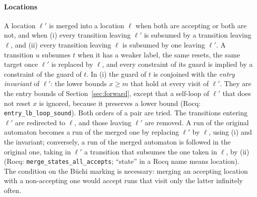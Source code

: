 \paragraph{Locations}
A location $\ell'$ is merged into a location $\ell$ when both are accepting or
both are not, and when (i) every transition leaving $\ell'$ is subsumed by a
transition leaving $\ell$, and (ii) every transition leaving $\ell$ is subsumed
by one leaving $\ell'$.  A transition $u$ subsumes $t$ when it has a weaker
label, the same resets, the same target once $\ell'$ is replaced by $\ell$, and
every constraint of its guard is implied by a constraint of the guard of $t$.
In (i) the guard of $t$ is conjoined with the \emph{entry invariant} of
$\ell'$: the lower bounds $x\ge m$ that hold at every visit of $\ell'$.  They
are the entry bounds of Section~\ref{sec:forward}, except that a self-loop of
$\ell'$ that does not reset $x$ is ignored, because it preserves a lower bound
(Rocq: \texttt{entry\_\allowbreak{}lb\_\allowbreak{}loop\_\allowbreak{}sound}).
Both orders of a pair are tried.  The transitions entering
$\ell'$ are redirected to $\ell$, and those leaving $\ell'$ are removed.  A run
of the original automaton becomes a run of the merged one by replacing $\ell'$
by $\ell$, using (i) and the invariant; conversely, a run of the merged
automaton is followed in the original one, taking in $\ell'$ a transition that
subsumes the one taken in $\ell$, by (ii)
(Rocq: \texttt{merge\_\allowbreak{}states\_\allowbreak{}all\_\allowbreak{}accepts}; ``state'' in a Rocq name
means location).  The condition on the B\"uchi marking is necessary: merging
an accepting location with a non-accepting one would accept runs that visit only the latter infinitely
often.
